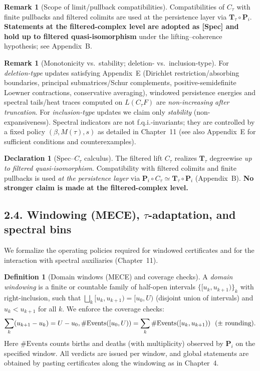 \documentclass[11pt]{article}
\numberwithin{equation}{section}
\theoremstyle{definition}
\newtheorem{definition}[theorem]{Definition}
\newtheorem{remark}[theorem]{Remark}
\newtheorem{declaration}[theorem]{Declaration}
\providecommand{\n}{\unskip\space}
\begin{document}
\begin{remark}[Scope of limit/pullback compatibilities]
Compatibilities of \(C_\tau\) with finite pullbacks and filtered colimits are used at the
persistence layer via \(\mathbf{T}_\tau\circ \mathbf{P}_i\).
\textbf{Statements at the filtered-complex level are adopted as [Spec] and hold up to filtered quasi-isomorphism} under the lifting–coherence hypothesis; see Appendix~B.
\end{remark}

\begin{remark}[Monotonicity vs.\ stability; deletion- vs.\ inclusion-type]\label{rk:monotone-stable}
For \emph{deletion-type} updates satisfying Appendix~E (Dirichlet restriction/absorbing boundaries, principal submatrices/Schur complements, positive-semidefinite Loewner contractions, conservative averaging), windowed persistence energies and spectral tails/heat traces computed on \(L(C_\tau F)\) are \emph{non-increasing after truncation}. For \emph{inclusion-type} updates we claim only \emph{stability} (non-expansiveness). Spectral indicators are not f.q.i.-invariants; they are controlled by a fixed policy \((\beta,M(\tau),s)\) as detailed in Chapter~11 (see also Appendix~E for sufficient conditions and counterexamples).
\end{remark}

\begin{declaration}[Spec–\texorpdfstring{$C_\tau$}{C\_\texttau} calculus]\label{spec:Ctau-calc}
The filtered lift \(C_\tau\) realizes \(\mathbf{T}_\tau\) degreewise \emph{up to filtered quasi-isomorphism}.
Compatibility with filtered colimits and finite pullbacks is used \emph{at the persistence layer} via
\(\mathbf{P}_i\!\circ C_\tau\simeq \mathbf{T}_\tau\!\circ \mathbf{P}_i\) (Appendix~B).
\textbf{No stronger claim is made at the filtered-complex level.}
\end{declaration}

\subsection*{2.4. Windowing (MECE), $\tau$-adaptation, and spectral bins}
We formalize the operating policies required for windowed certificates and for the interaction with spectral auxiliaries (Chapter~11).

\begin{definition}[Domain windows (MECE) and coverage checks]\label{def:ch2-mece}
A \emph{domain windowing} is a finite or countable family of half-open intervals \(\{[u_k,u_{k+1})\}_k\) with right-inclusion, such that \(\bigsqcup_k [u_k,u_{k+1})=[u_0,U)\) (disjoint union of intervals) and \(u_k<u_{k+1}\) for all \(k\).
We enforce the coverage checks:
\[
\sum_k (u_{k+1}-u_k)=U-u_0,\qquad\n\#\mathrm{Events}([u_0,U))=\sum_k \#\mathrm{Events}([u_k,u_{k+1}))\ \ (\pm\ \text{rounding}).
\]
Here \(\#\mathrm{Events}\) counts births and deaths (with multiplicity) observed by \(\mathbf{P}_i\) on the specified window. All verdicts are issued per window, and global statements are obtained by pasting certificates along the windowing as in Chapter~4.
\end{definition}
\end{document}
